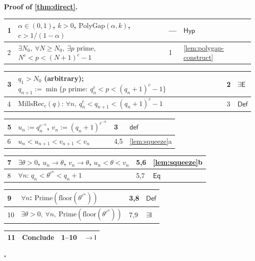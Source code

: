 \documentclass[11pt,reqno]{amsart}
\theoremstyle{blueplain}
\renewcommand{\qedsymbol}{\textcolor{proofqed}{\ensuremath{\square}}}
\renewenvironment{proof}[1][Proof]{\par\noindent\textbf{\textcolor{proofhead}{#1.}}\par\nobreak}{\par\nobreak\hfill\qedsymbol}
\numberwithin{equation}{section}
\begin{document}
\begin{proof}[\textbf{Proof of \cref{thm:direct}}]
\label{proof:direct}
{\scriptsize
\begin{tabular}{|m{0.7cm}|m{12cm}|m{1.4cm}|m{2.5cm}|}
\hline
1 & $\alpha\in(0,1)$, $k>0$, $\mathrm{PolyGap}(\alpha,k)$, $c>1/(1-\alpha)$ & --- & $\mathsf{Hyp}$ \\ \hline
2 & $\exists N_0,\ \forall N\ge N_0,\ \exists p$ prime, $N^c<p<(N+1)^c-1$ & 1 & \cref{lem:polygap-construct} \\
\end{tabular}%
\noindent \newline
\noindent
\begin{tabular}{|m{0.7cm}|m{12cm}|m{1.4cm}|m{2.5cm}|}
\hline
3 & $q_1>N_0$ (arbitrary); $q_{n+1}:=\min\{p \text{ prime}:\ q_n^c<p<(q_n+1)^c-1\}$ & 2 & $\exists\mathsf{E}$ \\ \hline
4 & $\mathrm{MillsRec}_c(q)$: $\forall n,\ q_n^c<q_{n+1}<(q_n+1)^c-1$ & 3 & $\mathsf{Def}$ \\
\end{tabular}%
\noindent \newline
\noindent
\begin{tabular}{|m{0.7cm}|m{12cm}|m{1.4cm}|m{2.5cm}|}
\hline
5 & $u_n:=q_n^{c^{-n}}$, $v_n:=(q_n+1)^{c^{-n}}$ & 3 & $\mathsf{def}$ \\ \hline
6 & $u_n<u_{n+1}<v_{n+1}<v_n$ & 4,5 & \cref{lem:squeeze}a \\
\end{tabular}%
\noindent \newline
\noindent
\begin{tabular}{|m{0.7cm}|m{12cm}|m{1.4cm}|m{2.5cm}|}
\hline
7 & $\exists\theta>0$, $u_n\to\theta$, $v_n\to\theta$, $u_n<\theta<v_n$ & 5,6 & \cref{lem:squeeze}b \\ \hline
8 & $\forall n$: $q_n<\theta^{c^n}<q_n+1$ & 5,7 & $\mathsf{Eq}$ \\
\end{tabular}%
\noindent \newline
\noindent
\begin{tabular}{|m{0.7cm}|m{12cm}|m{1.4cm}|m{2.5cm}|}
\hline
9 & $\forall n$: $\mathrm{Prime}(\mathrm{floor}(\theta^{c^n}))$ & 3,8 & $\mathsf{Def}$ \\ \hline
10 & $\exists\theta>0,\ \forall n,\ \mathrm{Prime}(\mathrm{floor}(\theta^{c^n}))$ & 7,9 & $\exists\mathsf{I}$ \\
\end{tabular}%
\noindent \newline
\noindent
\begin{tabular}{|m{0.7cm}|m{12cm}|m{1.4cm}|m{2.5cm}|}
\hline
11 & Conclude & 1--10 & $\rightarrow\mathsf{I}$ \\ \hline
\end{tabular}%
}
\end{proof}
\end{document}
